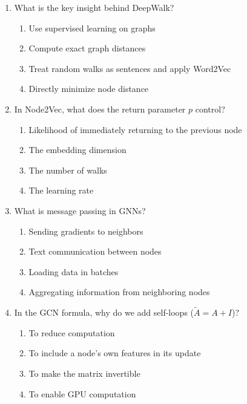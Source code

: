 \documentclass[12pt,a4paper]{article}
\begin{document}
\begin{enumerate}
\newpage
\section*{\textcolor{medium}{Section 2: Medium (Questions 31-60)}}

\item What is the key insight behind DeepWalk?
\begin{enumerate}[label=\Alph*)]
    \item Use supervised learning on graphs
    \item Compute exact graph distances
    \item Treat random walks as sentences and apply Word2Vec
    \item Directly minimize node distance
\end{enumerate}

\item In Node2Vec, what does the return parameter $p$ control?
\begin{enumerate}[label=\Alph*)]
    \item Likelihood of immediately returning to the previous node
    \item The embedding dimension
    \item The number of walks
    \item The learning rate
\end{enumerate}

\item What is message passing in GNNs?
\begin{enumerate}[label=\Alph*)]
    \item Sending gradients to neighbors
    \item Text communication between nodes
    \item Loading data in batches
    \item Aggregating information from neighboring nodes
\end{enumerate}

\item In the GCN formula, why do we add self-loops ($\tilde{A} = A + I$)?
\begin{enumerate}[label=\Alph*)]
    \item To reduce computation
    \item To include a node's own features in its update
    \item To make the matrix invertible
    \item To enable GPU computation
\end{enumerate}


\end{enumerate}
\end{document}
